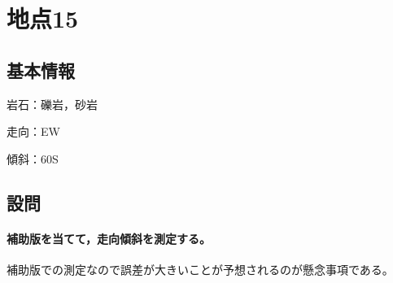\documentclass[uplatex,b5paper]{jsreport}
\begin{document}
  \section{地点15}
    \subsection{基本情報}
    岩石：礫岩，砂岩\par
    走向：EW\par
    傾斜：60\textdegree S
    \subsection{設問}
      \paragraph{補助版を当てて，走向傾斜を測定する。}
      補助版での測定なので誤差が大きいことが予想されるのが懸念事項である。
\end{document}

